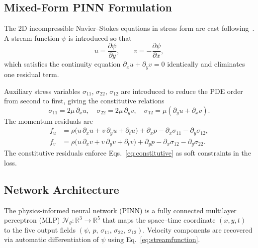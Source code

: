 
\subsection{Mixed-Form PINN Formulation}

The 2D incompressible Navier--Stokes equations in stress form are cast
following~\cite{rao2020pinnflow}.  A stream function $\psi$ is introduced
so that
\begin{equation}
  u = \frac{\partial\psi}{\partial y}, \qquad
  v = -\frac{\partial\psi}{\partial x},
  \label{eq:streamfunction}
\end{equation}
which satisfies the continuity equation $\partial_x u + \partial_y v = 0$
identically and eliminates one residual term.

Auxiliary stress variables $\sigma_{11}$, $\sigma_{22}$, $\sigma_{12}$
are introduced to reduce the PDE order from second to first, giving the
constitutive relations
\begin{equation}
  \sigma_{11} = 2\mu\,\partial_x u, \quad
  \sigma_{22} = 2\mu\,\partial_y v, \quad
  \sigma_{12} = \mu(\partial_y u + \partial_x v).
  \label{eq:constitutive}
\end{equation}
The momentum residuals are
\begin{align}
  f_u &= \rho\bigl(u\,\partial_x u + v\,\partial_y u + \partial_t u\bigr)
         + \partial_x p - \partial_x\sigma_{11} - \partial_y\sigma_{12},
  \label{eq:fu}\\
  f_v &= \rho\bigl(u\,\partial_x v + v\,\partial_y v + \partial_t v\bigr)
         + \partial_y p - \partial_x\sigma_{12} - \partial_y\sigma_{22}.
  \label{eq:fv}
\end{align}
The constitutive residuals enforce Eqs.~\eqref{eq:constitutive} as soft
constraints in the loss.

\subsection{Network Architecture}

The physics-informed neural network (PINN) is a fully connected
multilayer perceptron (MLP) $\mathcal{N}_\theta : \mathbb{R}^3 \to
\mathbb{R}^5$ that maps the space--time coordinate $(x, y, t)$ to the
five output fields $(\psi,\, p,\, \sigma_{11},\, \sigma_{22},\,
\sigma_{12})$.  Velocity components are recovered via automatic
differentiation of $\psi$ using Eq.~\eqref{eq:streamfunction}.

